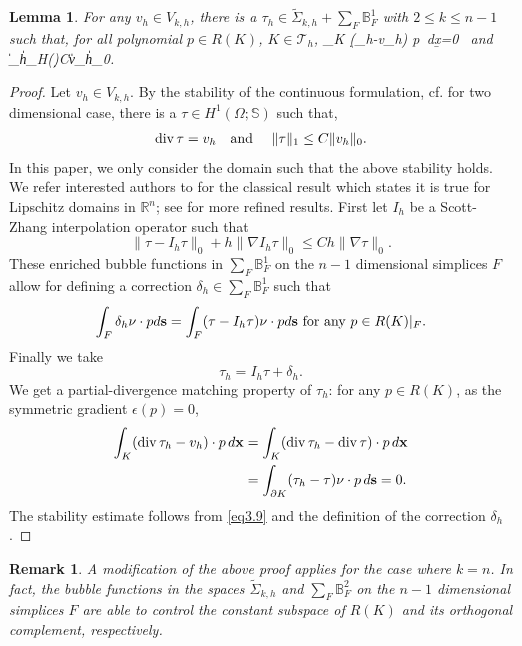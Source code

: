 \documentclass{amsart}
\newtheorem{lemma}{Lemma}[section]
\newtheorem{remark}{Remark}[section]
\def\a#1{\begin{align*}#1\end{align*}} \def\an#1{\begin{align}#1\end{align}}
\numberwithin{table}{section}
\numberwithin{figure}{section}
\begin{document}
\begin{lemma}\label{lemma1}
For any $v_h\in V_{k,h}$,  there is a $\tau_h \in
    \widetilde \Sigma_{k,h}+\sum\limits_{F}\mathbb{B}_F^1$  with $2\leq k\leq n-1$ such that,
  for all polynomial $p\in R(K)$, $K\in\mathcal{T}_h$,
   \bq\label{l-1}  \int_K (\d\tau_h-v_h) \cdot p\, d\b x=0
      \quad \hbox{\rm
      and } \quad \|\tau_h\|_{H(\d)}\leq C\|v_h\|_{0}. \eq
     \end{lemma}
\begin{proof}
  Let $v_h\in V_{k,h}$.
  By the stability of the continuous formulation,
      cf. \cite{Arnold-Winther-conforming} for two dimensional case, there is
    a $\tau \in  H^1(\Omega; \mathbb{S})$ such that,
   \a{ \d\tau=v_h \quad \hbox{\rm
      and } \quad \|\tau\|_{1}\le  C\|v_h\|_{0}. }
In this paper, we only consider the domain such that the above stability holds. We refer interested authors
    to \cite{GiraultRaviart1986} for the  classical result which states  it  is true for Lipschitz domains in
     $\mathbb{R}^n$; see \cite{Duran2001} for more refined results.
First let $I_h$ be a  Scott-Zhang \cite{Scott-Zhang}
   interpolation operator such that
  \begin{equation}\label{eq3.9}
  \|\tau-I_h\tau\|_0+h\|\nabla I_h\tau\|_0\leq Ch\|\nabla\tau\|_0.
  \end{equation}
   These enriched bubble  functions in $\sum\limits_{F}\mathbb{B}_F^1$  on the $n-1$ dimensional simplices $F$ allow for defining a correction $\delta_h\in \sum\limits_{F}\mathbb{B}_F^1$ such that
    \begin{equation}
    \int_{F} \delta_h\nu \cdot p d \mathbf{s}=\int_{F} (\tau-I_h\tau)\nu\cdot p d\mathbf{s}\text{ for any }
    p\in R(K)|_{F}.
    \end{equation}
    Finally we take
    \begin{equation}
    \tau_h=I_h\tau+\delta_h.
    \end{equation}
    We get  a partial-divergence matching property of $\tau_h$:
     for any $p\in R(K)$,  as the symmetric gradient $\epsilon( p)=0$,
 \a{  \int_K (\d\tau_h-v_h) \cdot p \, d\b x
     & = \int_K (\d\tau_h-\d \tau) \cdot p \, d\b x\\
        & = \int_{\partial K}  (\tau_h-\tau)\nu\cdot p\,  d\b s =0.}
 The  stability estimate follows from \eqref{eq3.9} and  the definition of the correction $\delta_h$.
\end{proof}

\begin{remark}\label{remark4.1} A  modification of the above proof applies for the case where $k=n$.  In fact,
the bubble functions in the spaces $\widetilde \Sigma_{k,h}$ and  $\sum\limits_{F}\mathbb{B}_F^2$
on the $n-1$ dimensional simplices $F$ are able   to control the  constant  subspace of $R(K)$
and its  orthogonal complement, respectively.
\end{remark}
\end{document}
